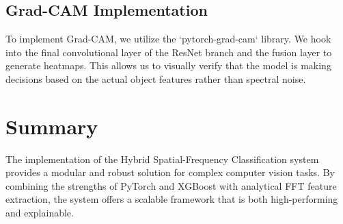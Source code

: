 \subsection{Grad-CAM Implementation}
To implement Grad-CAM, we utilize the `pytorch-grad-cam` library. We hook into the final convolutional layer of the ResNet branch and the fusion layer to generate heatmaps. This allows us to visually verify that the model is making decisions based on the actual object features rather than spectral noise.

\section{Summary}
The implementation of the Hybrid Spatial-Frequency Classification system provides a modular and robust solution for complex computer vision tasks. By combining the strengths of PyTorch and XGBoost with analytical FFT feature extraction, the system offers a scalable framework that is both high-performing and explainable.
